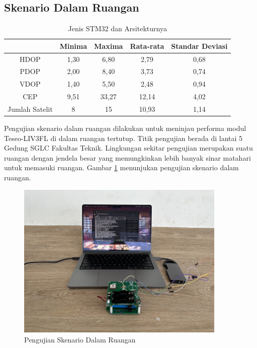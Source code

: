 \subsection{Skenario Dalam Ruangan}
\begin{table}[H]
	\caption{Jenis STM32 dan Arsitekturnya}
	\vspace{0.5em}
	\centering
	\begin{tabular}{ccccc}
		\hline
		& \textbf{Minima} & \textbf{Maxima} & \textbf{Rata-rata} & \textbf{Standar Deviasi}\\
		\hline 
		HDOP & 1,30 & 6,80 & 2,79 & 0,68\\
		PDOP & 2,00 & 8,40 & 3,73 & 0,74\\
		VDOP & 1,40 & 5,50 & 2,48 & 0,94\\
		CEP & 9,51	& 33,27 & 12,14 & 4,02\\
		Jumlah Satelit & 8 & 15 & 10,93 & 1,14\\
		\hline
	\end{tabular}
	\label{Tab: indoor-table}
\end{table}

Pengujian skenario dalam ruangan dilakukan untuk meninjau performa modul Teseo-LIV3FL di dalam ruangan tertutup. Titik pengujian berada di lantai 5 Gedung SGLC Fakultas Teknik. Lingkungan sekitar pengujian merupakan suatu ruangan dengan jendela besar yang memungkinkan lebih banyak sinar matahari untuk memasuki ruangan. Gambar \ref{Fig: indoor-keadaan} menunjukan pengujian skenario dalam ruangan.

\begin{figure}[ht]
	\centering
	\includegraphics[width=10cm]{contents/chapter-4/2-skenario-indoor/keadaan.jpg}
	\caption{Pengujian Skenario Dalam Ruangan}
	\label{Fig: indoor-keadaan}
\end{figure}

